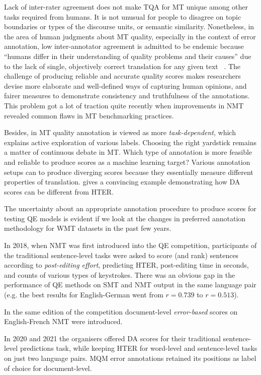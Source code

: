 Lack of inter-rater agreement does not make TQA for MT unique among other tasks required from humans. It is not unusual for people to disagree on topic boundaries or types of the discourse units, or semantic similarity. Nonetheless, in the area of human judgments about MT quality, especially in the context of error annotation, low inter-annotator agreement is admitted to be endemic because ``humans differ in their understanding of quality problems and their causes'' due to the lack of single, objectively correct translation for any given text ~\cite{Lommel2014}. The challenge of producing reliable and accurate quality scores makes researchers devise more elaborate and well-defined ways of capturing human opinions, and fairer measures to demonstrate consistency and truthfulness of the annotations. This problem got a lot of traction quite recently when improvements in \gls{NMT} revealed common flaws in MT benchmarking practices.

Besides, in MT quality annotation is viewed as more \textit{task-dependent}, which explains active exploration of various labels.
Choosing the right yardstick remains a matter of continuous debate in MT. Which type of annotation is more feasible and reliable to produce scores as a machine learning target?
Various annotation setups can to produce diverging scores because they essentially measure different properties of translation. \cite[p.101]{Yankovskaya2019} gives a convincing example demonstrating how \gls{DA} scores can be different from \gls{HTER}. 

The uncertainty about an appropriate annotation procedure to produce scores for testing QE models is evident if we look at the changes in preferred annotation methodology for \gls{WMT} datasets in the past few years. 

In 2018, when NMT was first introduced into the QE competition, participants of the traditional sentence-level tasks were asked to score (and rank) sentences according to \textit{post-editing effort}, predicting \gls{HTER}, post-editing time in seconds, and counts of various types of keystrokes. There was an obvious gap in the performance of QE methods on \gls{SMT} and NMT output in the same language pair (e.g. the best results for English-German went from $r=0.739$ to $r=0.513$). 

In the same edition of the competition document-level \textit{error-based} scores on English-French NMT were introduced.

In 2020 and 2021 the organisers offered \gls{DA} scores for their traditional sentence-level predictions task, while keeping HTER for word-level and sentence-level tasks on just two language pairs. \gls{MQM} error annotations retained its positions as label of choice for document-level.

